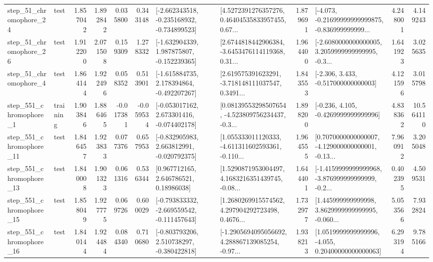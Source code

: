 \begin{tabular}{llrrrrllrlrr}
   step\_51\_chromophore\_24 &      test &      1.857042 &    1.892842 &      0.035800 &  0.343148 &  [-2.662343518, -0.235168932, -0.734899523] &  [4.5272391276357276, 0.46404535833957455, 0.67... &       1.879691 &  [-4.073, -0.21699999999999875, -0.836999999999... &            4.248001 &          4.149243 \\
   step\_51\_chromophore\_26 &      test &      1.912200 &    2.071508 &      0.159309 &  1.278332 &   [-1.632904339, 1.987875807, -0.152239365] &  [2.6744818442906384, -3.6453476114119368, 0.31... &       1.964400 &  [-2.6080000000000005, 3.2059999999999995, -0.3... &            1.641923 &          3.025635 \\
    step\_51\_chromophore\_4 &      test &      1.864144 &    1.922496 &      0.058352 &  0.513901 &   [-1.615884735, 2.178394864, -0.492207267] &  [2.619575391623291, -3.718148111037547, 0.3491... &       1.843553 &                [-2.306, 3.433, -0.517000000000003] &            4.121596 &          3.015798 \\
   step\_551\_chromophore\_1 &  training &      1.903846 &    1.886465 &     -0.017381 & -0.059534 &   [-0.053017162, 2.673301416, -0.074402178] &  [0.08139553298507654, -4.523809756234437, -0.3... &       1.898200 &               [-0.236, 4.105, -0.4269999999999996] &            4.838362 &         10.564110 \\
  step\_551\_chromophore\_11 &      test &      1.846457 &    1.923833 &      0.077376 &  0.657953 &   [-0.832905983, 2.663812991, -0.020792375] &  [1.055333011120333, -4.611311602593361, -0.110... &       1.964555 &  [0.7070000000000007, -4.129000000000001, -0.13... &            7.960912 &          3.205048 \\
  step\_551\_chromophore\_13 &      test &      1.840008 &    1.901323 &      0.061316 &  0.536344 &      [0.967712165, 2.646786521, 0.18986038] &  [1.5290871953004497, 4.1683216351439745, -0.08... &       1.644401 &  [-1.4159999999999968, -3.876999999999999, -0.2... &            0.402395 &          4.509531 \\
  step\_551\_chromophore\_15 &      test &      1.858049 &    1.927775 &      0.069726 &  0.600029 &  [-0.793833332, -2.669559542, -0.111457643] &  [1.2680269915574562, 4.297904292723498, 0.4676... &       1.732977 &  [1.445999999999998, 3.8629999999999995, -0.060... &            5.053566 &          7.932824 \\
  step\_551\_chromophore\_16 &      test &      1.840144 &    1.924484 &      0.084340 &  0.710680 &   [-0.803793206, 2.510738297, -0.380422818] &  [-1.2905694095056692, 4.288867139085254, -0.97... &       1.938213 &  [1.0519999999999996, -4.055, 0.20400000000000063] &            6.293194 &          9.785166 \\

\end{tabular}

